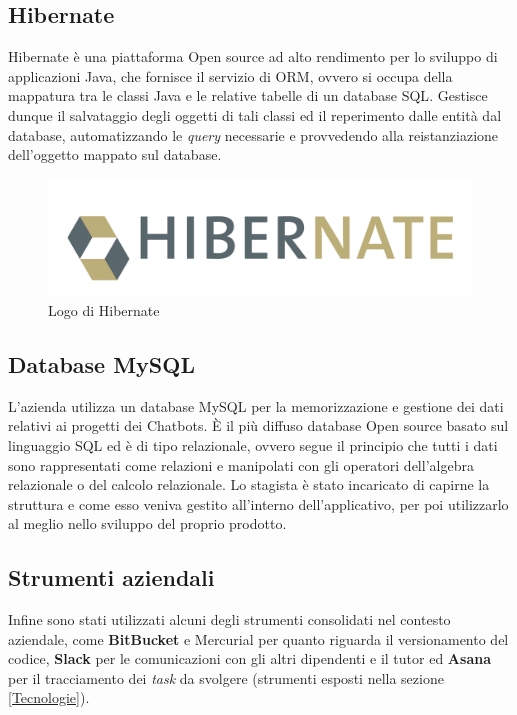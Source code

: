 \subsection{Hibernate}
Hibernate è una piattaforma \gls{Open source} ad alto rendimento per lo sviluppo di applicazioni Java, che fornisce il servizio di \gls{ORM}, ovvero si occupa della mappatura tra le classi Java e le relative tabelle di un database \gls{SQL}.
Gestisce dunque il salvataggio degli oggetti di tali classi ed il reperimento dalle entità dal database, automatizzando le \emph{query} necessarie e provvedendo alla reistanziazione dell’oggetto mappato sul database.
\begin{figure}[h]
	\centering
	\includegraphics[scale=0.35]{../Immagini/Hibernate.png}
	\caption{Logo di Hibernate}
\end{figure}

\subsection{Database MySQL} 
L'azienda \azienda{} utilizza un database MySQL per la memorizzazione e gestione dei dati relativi ai progetti dei \glspl{Chatbot}. È il più diffuso database \gls{Open source} basato sul linguaggio \gls{SQL} ed è di tipo relazionale, ovvero segue il principio che tutti i dati sono rappresentati come relazioni e manipolati con gli operatori dell’algebra relazionale o del calcolo relazionale.
Lo stagista è stato incaricato di capirne la struttura e come esso veniva gestito all'interno dell'applicativo, per poi utilizzarlo al meglio nello sviluppo del proprio prodotto.\\

\subsection{Strumenti aziendali}
Infine sono stati utilizzati alcuni degli strumenti consolidati nel contesto aziendale, come \textbf{BitBucket} e \gls{Mercurial} per quanto riguarda il versionamento del codice, \textbf{Slack} per le comunicazioni con gli altri dipendenti e il tutor ed \textbf{Asana} per il tracciamento dei \emph{task} da svolgere (strumenti esposti nella sezione \ref{Tecnologie}).



